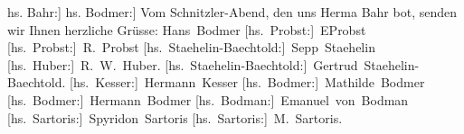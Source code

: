            \noindent{}{[}hs. Bahr:{]} \label{T_L01799_1v}\label{T_L01799_1h}\pend
           \pstart
           \noindent{}{\pb}{[}hs. Bodmer:{]} Vom Schnitzler-Abend, den uns Herma{\geminationn} Bahr bot, senden wir Ihnen herzliche Grüsse:\pend
           \pstart
           \spacefill\mbox{Hans Bodmer}\pend
           \pstart
           \spacefill\mbox{{[}hs. Probst:{]} EProbst}\pend
           \pstart
           \spacefill\mbox{{[}hs. Probst:{]} R. Probst}\pend
           \pstart
           \spacefill\mbox{{[}hs. Staehelin-Baechtold:{]} Sepp Staehelin}\pend
           \pstart
           \spacefill\mbox{{[}hs. Huber:{]} R. W. Huber.}\pend
           \pstart
           \spacefill\mbox{{[}hs. Staehelin-Baechtold:{]} Gertrud Staehelin-Baechtold.}\pend
           \pstart
           \spacefill\mbox{{[}hs. Kesser:{]} Hermann Kesser}\pend
           \pstart
           \spacefill\mbox{{[}hs. Bodmer:{]} Mathilde Bodmer}\pend
           \pstart
           \spacefill\mbox{{[}hs. Bodmer:{]} Hermann Bodmer}\pend
           \pstart
           \spacefill\mbox{{[}hs. Bodman:{]} Emanuel von Bodman}\pend
           \pstart
           \spacefill\mbox{{[}hs. Sartoris:{]} Spyridon Sartoris}\pend
           \pstart
           \spacefill\mbox{{[}hs. Sartoris:{]} M. Sartoris.}\pend
